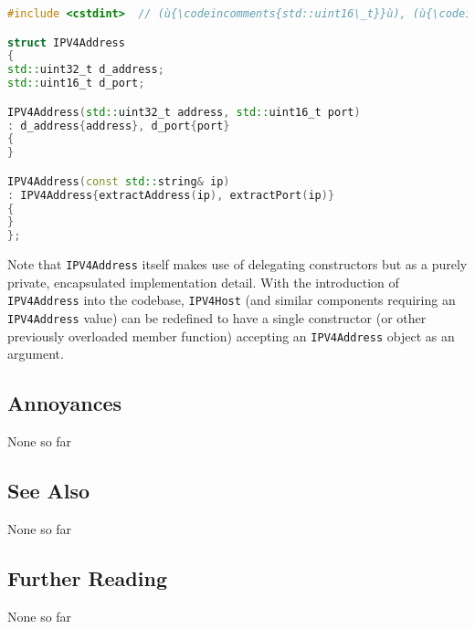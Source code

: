 \begin{lstlisting}[language=C++]
#include <cstdint>  // (ù{\codeincomments{std::uint16\_t}}ù), (ù{\codeincomments{std::uint32\_t}}ù)

struct IPV4Address
{
std::uint32_t d_address;
std::uint16_t d_port;

IPV4Address(std::uint32_t address, std::uint16_t port)
: d_address{address}, d_port{port}
{
}

IPV4Address(const std::string& ip)
: IPV4Address{extractAddress(ip), extractPort(ip)}
{
}
};
\end{lstlisting}

\noindent Note that \texttt{IPV4Address} itself makes use of delegating
constructors but as a purely private, encapsulated implementation
detail. With the introduction of \texttt{IPV4Address} into the codebase,
\texttt{IPV4Host} (and similar components requiring an
\texttt{IPV4Address} value) can be redefined to have a single
constructor (or other previously overloaded member function) accepting
an \texttt{IPV4Address} object as an argument.

\subsection[Annoyances]{Annoyances}\label{annoyances}

None so far

\subsection[See Also]{See Also}\label{see-also}

None so far

\subsection[Further Reading]{Further Reading}\label{further-reading}

None so far



